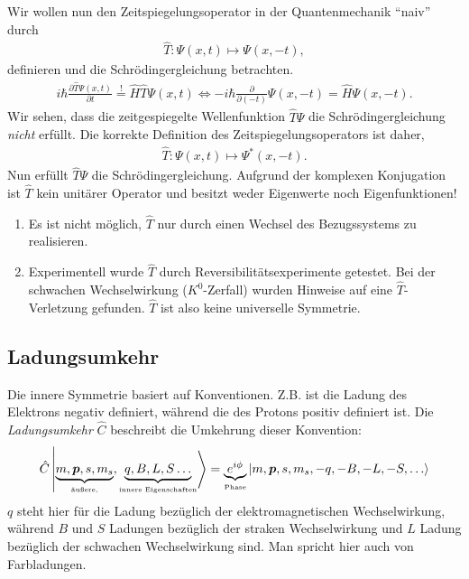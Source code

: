 Wir wollen nun den Zeitspiegelungsoperator in der Quantenmechanik ``naiv'' durch
\begin{align*}
\hat{T}: \Psi(x,t) \mapsto \Psi(x,-t),
\end{align*}
definieren und die Schrödingergleichung betrachten.
\begin{align*}
i\hbar \frac{\partial \hat{T}\Psi(x,t)}{\partial t} \overset{!}{=}
\hat{H}\hat{T}\Psi(x,t)
\Leftrightarrow
-i\hbar \frac{\partial}{\partial (-t)}\Psi(x,-t) = \hat{H}\Psi(x,-t).
\end{align*}
Wir sehen, dass die zeitgespiegelte Wellenfunktion $\hat{T}\Psi$ die
Schrödingergleichung \textit{nicht} erfüllt. Die korrekte Definition des
Zeitspiegelungsoperators ist daher,
\begin{align*}
\hat{T}: \Psi(x,t)\mapsto \Psi^*(x,-t).
\end{align*}
Nun erfüllt $\hat{T}\Psi$ die Schrödingergleichung. Aufgrund der komplexen
Konjugation ist $\hat{T}$ kein unitärer Operator und besitzt weder 
Eigenwerte noch Eigenfunktionen!

\begin{bemn}[Bemerkungen.]
\begin{enumerate}[label=\arabic{*}.)]
  \item 
Es ist nicht möglich, $\hat{T}$ nur durch einen Wechsel des Bezugssystems zu
realisieren.
\item Experimentell wurde $\hat{T}$ durch Reversibilitätsexperimente getestet.
Bei der schwachen Wechselwirkung ($K^0$-Zerfall) wurden Hinweise auf eine
$\hat{T}$-Verletzung gefunden. $\hat{T}$ ist also keine universelle
Symmetrie.\maphere
\end{enumerate}
\end{bemn}

\subsection{Ladungsumkehr}
Die innere Symmetrie basiert auf Konventionen. Z.B. ist die Ladung des
Elektrons negativ definiert, während die des Protons positiv definiert ist. Die
\emph{Ladungsumkehr} $\hat{C}$ beschreibt die Umkehrung dieser Konvention:
\begin{align*}
\hat{C}\left|\underbrace{m,\bm{p},s,m_s}_{\text{\tiny
äußere,}},\underbrace{q,B,L,S\ldots}_{\text{\tiny innere Eigenschaften}}\right\rangle
= \underbrace{e^{i\phi}}_{\text{\tiny
Phase}}\left|m,\bm{p},s,m_s,-q,-B,-L,-S,\ldots\right\rangle
\end{align*}
$q$ steht hier für die Ladung bezüglich der elektromagnetischen Wechselwirkung,
während $B$ und $S$ Ladungen bezüglich der straken Wechselwirkung und $L$ Ladung
bezüglich der schwachen Wechselwirkung sind. Man spricht hier auch von
Farbladungen.

